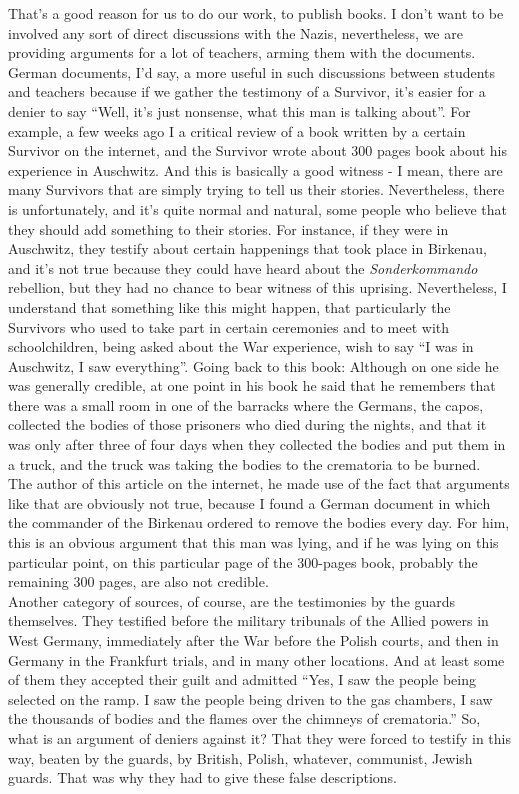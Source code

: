 That's a good reason for us to do our work, to publish books. I don’t want to be involved any sort of direct discussions with the Nazis, nevertheless, we are providing arguments for a lot of teachers, arming them with the documents. German documents, I'd say, a more useful in such discussions between students and teachers because if we gather the testimony of a Survivor, it’s easier for a denier to say ``Well, it’s just nonsense, what this man is talking about''. For example, a few weeks ago I a critical review of a book written by a certain Survivor on the internet, and the Survivor wrote about 300 pages book about his experience in Auschwitz. And this is basically a good witness - I mean, there are many Survivors that are simply trying to tell us their stories. Nevertheless, there is unfortunately, and it's quite normal and natural, some people who believe that they should add something to their stories. For instance, if they were in Auschwitz, they testify about certain happenings that took place in Birkenau, and it’s not true because they could have heard about the \textit{Sonderkommando} rebellion, but they had no chance to bear witness of this uprising. Nevertheless, I understand that something like this might happen, that particularly the Survivors who used to take part in certain ceremonies and to meet with schoolchildren, being asked about the War experience, wish to say ``I was in Auschwitz, I saw everything''. Going back to this book: Although on one side he was generally credible, at one point in his book he said that he remembers that there was a small room in one of the barracks where the Germans, the capos, collected the bodies of those prisoners who died during the nights, and that it was only after three of four days when they collected the bodies and put them in a truck, and the truck was taking the bodies to the crematoria to be burned. \\
The author of this article on the internet, he made use of the fact that arguments like that are obviously not true, because I found a German document in which the commander of the Birkenau ordered to remove the bodies every day. For him, this is an obvious argument that this man was lying, and if he was lying on this particular point, on this particular page of the 300-pages book, probably the remaining 300 pages, are also not credible.\\
Another category of sources, of course, are the testimonies by the guards themselves. They testified before the military tribunals of the Allied powers in West Germany, immediately after the War before the Polish courts, and then in Germany in the Frankfurt trials, and in many other locations. And at least some of them they accepted their guilt and admitted ``Yes, I saw the people being selected on the ramp. I saw the people being driven to the gas chambers, I saw the thousands of bodies and the flames over the chimneys of crematoria.'' So, what is an argument of deniers against it? That they were forced to testify in this way, beaten by the guards, by British, Polish, whatever, communist, Jewish guards. That was why they had to give these false descriptions. \\
